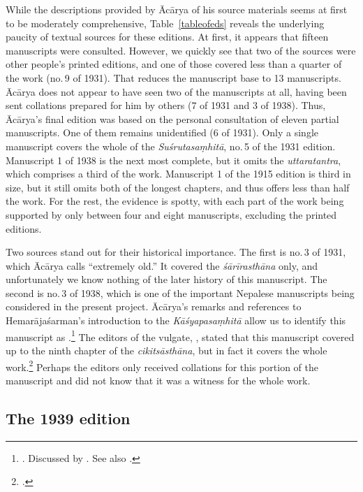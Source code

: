 While the descriptions provided by Ācārya of his source materials seems at first
to be moderately comprehensive, Table~\ref{tableofeds} reveals the underlying
paucity of textual sources for these editions.  At first, it appears that fifteen
manuscripts were consulted.  However, we quickly see that two of the sources 
were
other people's printed editions, and one of those covered less than a quarter of
the work (no.\,9 of 1931).  That reduces the manuscript base to 13 manuscripts.
Ācārya does not appear to have seen two of the manuscripts at all, having been
sent collations prepared for him by others (7 of 1931 and 3 of 1938).  Thus,
Ācārya's final edition was based on the personal consultation of eleven partial
manuscripts.   One of them remains unidentified (6 of 1931). Only a single
manuscript covers the whole of the \emph{Suśrutasaṃhitā}, no.\,5 of the 1931
edition.  Manuscript 1 of 1938 is the next most complete, but it omits the
\emph{uttaratantra}, which comprises a third of the work.  Manuscript 1 of the
1915 edition is third in size, but it still omits both of the longest chapters,
and thus offers less than half the work.  For the rest, the evidence is spotty,
with each part of the work being supported by only between four and eight
manuscripts, excluding the printed editions.

Two sources stand out for their historical importance.  The first is no.\,3 of
1931, which Ācārya calls “extremely old.”  It covered the \emph{śārīrasthāna}
only, and unfortunately we know nothing of the later history of this manuscript.
The second is no.\,3 of 1938, which is one of the important Nepalese manuscripts
being considered in the present project. Ācārya's remarks and references to
Hemarājaśarman's introduction to the \emph{Kāśyapasaṃhitā} allow us
to identify this manuscript as .\footnote{\cites[22]{vulgate}[56--57]{hema-1938}. Discussed by
\citet[\S 1.1, 2.3]{kleb-2021b}.  See also \cites[IIB, 
25--41]{meul-hist}[161--169]{wuja-2003}.} The editors of the vulgate, \citeauthor{vulgate}, 
stated that this manuscript covered up to the ninth chapter of the \emph{cikitsāsthāna}, but 
in fact it covers the whole work.\footcite[22]{vulgate}  Perhaps the editors
only received collations for this portion of the manuscript and did not know that it
was a witness for the whole work.

\subsection{The 1939 edition}        
\label{1939edition}

